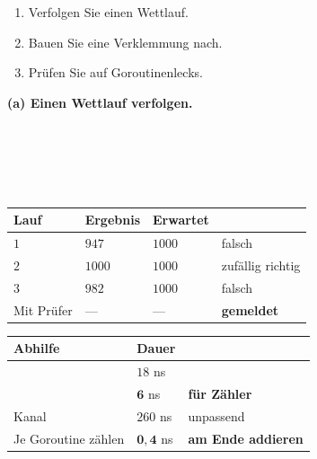 \begin{aufgabe}
\begin{enumerate}[label=(\alph*)]
\item Verfolgen Sie einen Wettlauf.
\item Bauen Sie eine Verklemmung nach.
\item Prüfen Sie auf Goroutinenlecks.
\end{enumerate}

\loesung
\textbf{(a) Einen Wettlauf verfolgen.}

\begin{center}
\begin{minipage}{0.9\textwidth}
\\
\\
\\
\\
\code{\}}
\end{minipage}
\end{center}

\begin{center}
\renewcommand{\arraystretch}{1.45}
\begin{tabular}{@{}P{2.8cm}P{2.2cm}P{2.4cm}P{1.8cm}@{}}
\toprule
\textbf{Lauf} & \textbf{Ergebnis} & \textbf{Erwartet} & \\
\midrule
$1$ & $947$ & $1000$ & \textcolor{akzent}{falsch}\\
$2$ & $1000$ & $1000$ & \textcolor{mittel}{zufällig richtig}\\
$3$ & $982$ & $1000$ & \textcolor{akzent}{falsch}\\
Mit Prüfer & --- & --- & \textcolor{gruen}{\textbf{gemeldet}}\\
\bottomrule
\end{tabular}
\end{center}

\begin{center}
\begin{minipage}{0.88\textwidth}
\end{minipage}
\end{center}

\begin{center}
\renewcommand{\arraystretch}{1.45}
\begin{tabular}{@{}P{3.4cm}P{2.0cm}P{2.6cm}@{}}
\toprule
\textbf{Abhilfe} & \textbf{Dauer} & \\
\midrule
{} & $18$ ns & \\
 & $\mathbf{6}$ ns & \textcolor{gruen}{\textbf{für Zähler}}\\
Kanal & $260$ ns & \textcolor{akzent}{unpassend}\\
Je Goroutine zählen & $\mathbf{0{,}4}$ ns & \textcolor{gruen}{\textbf{am Ende addieren}}\\
\bottomrule
\end{tabular}
\end{center}


\end{aufgabe}
